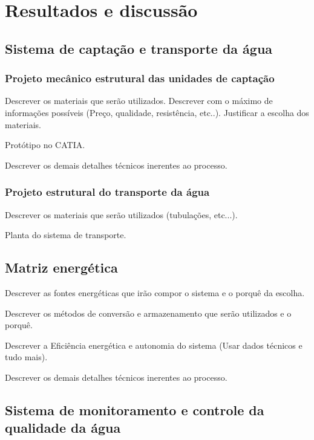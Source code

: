\chapter[Resultados]{Resultados e discussão}
 
  \section{Sistema de captação e transporte da água}
  
    \subsection{Projeto mecânico estrutural das unidades de captação}
    
    Descrever os materiais que serão utilizados. Descrever com o máximo de informações possíveis (Preço, qualidade, resistência, etc..).
    Justificar a escolha dos materiais.
    
    Protótipo no CATIA.
    
    Descrever os demais detalhes técnicos inerentes ao processo.
    
    \subsection{Projeto estrutural do transporte da água}
    
    Descrever os materiais que serão utilizados (tubulações, etc...).
    
    Planta do sistema de transporte.
    
    
  \section{Matriz energética}
  
    Descrever as fontes energéticas que irão compor o sistema e o porquê da escolha.
    
    Descrever os métodos de conversão e armazenamento que serão utilizados e o porquê.
    
    Descrever a Eficiência energética e autonomia do sistema (Usar dados técnicos e tudo mais).
    
    Descrever os demais detalhes técnicos inerentes ao processo.
    
  \section{Sistema de monitoramento e controle da qualidade da água}
  
